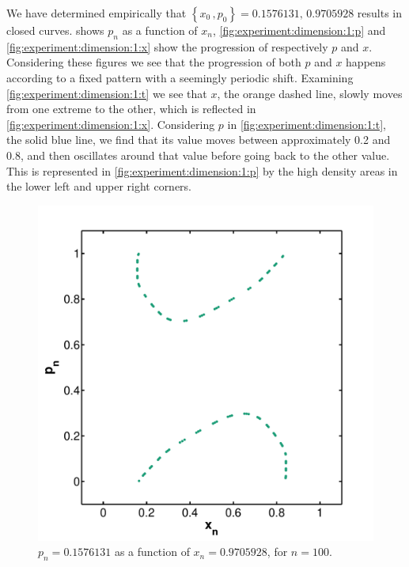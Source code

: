 We have determined empirically that $\left\{x_0\,, p_0 \right\} = {\num{0.1576131},\,\num{0.9705928}}$ results in closed curves.  shows $p_n$ as a function of $x_n$, \cref{fig:experiment:dimension:1:p} and \ref{fig:experiment:dimension:1:x} show the progression of respectively $p$ and $x$.\\

Considering these figures we see that the progression of both $p$ and $x$ happens according to a fixed pattern with a seemingly periodic shift. Examining \cref{fig:experiment:dimension:1:t} we see that $x$, the orange dashed line, slowly moves from one extreme to the other, which is reflected in \cref{fig:experiment:dimension:1:x}. Considering $p$ in \cref{fig:experiment:dimension:1:t}, the solid blue line, we find that its value moves between approximately 0.2 and 0.8, and then oscillates around that value before going back to the other value. This is represented in \cref{fig:experiment:dimension:1:p} by the high density areas in the lower left and upper right corners.

\begin{figure}
	\centering
	\includegraphics[width=0.9\columnwidth]{./img/assignment_a_1_dim_n100}
	\caption{$p_n = \num{0.1576131}$ as a function of $x_n= \num{0.9705928}$, for $n = 100$.}
	\label{fig:experiment:a_1_n100}
\end{figure}



